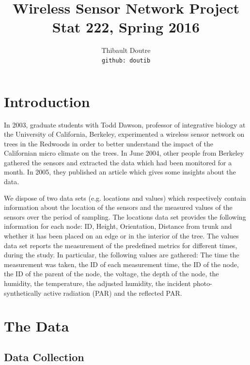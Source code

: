 \documentclass[11pt]{article}\usepackage[]{graphicx}\usepackage[]{color}
\title{Wireless Sensor Network Project\\
  Stat 222, Spring 2016}
\author{
  Thibault Doutre\\
  \texttt{github: doutib}
}
\begin{document}
\maketitle



\section{Introduction}
In 2003, graduate students with Todd Dawson, professor of integrative biology at the University of California, Berkeley, experimented a wireless sensor network on trees in the Redwoods \cite{yang2003redwoods} in order to better understand the impact of the Californian micro climate on the trees. In June 2004, other people from Berkeley gathered the sensors and extracted the data which had been monitored for a month. In 2005, they published an article \cite{tolle2005macroscope} which gives some insights about the data.

We dispose of two data sets (e.g. locations and values) which respectively contain information about the location of the sensors and the measured values of the sensors over the period of sampling.
The locations data set provides the following information for each node: ID, Height, Orientation, Distance from trunk and whether it has been placed on an edge or in the interior of the tree.
The values data set reports the measurement of the predefined metrics for different times, during the study. In particular, the following values are gathered: The time the measurement was taken, the ID of each measurement time, the ID of the node, the ID of the parent of the node, the voltage, the depth of the node, the humidity, the temperature, the adjusted humidity, the incident photo-synthetically active radiation (PAR) and the reflected PAR. 


\section{The Data}


\subsection{Data Collection}
\end{document}
